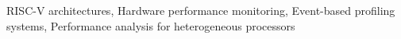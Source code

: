 \begin{cventries}
    
    \cventry
    {RISC-V architectures, Hardware performance monitoring, Event-based profiling systems, Performance analysis for heterogeneous processors}
    {}
    {}
    {}
    {}
    
\end{cventries}